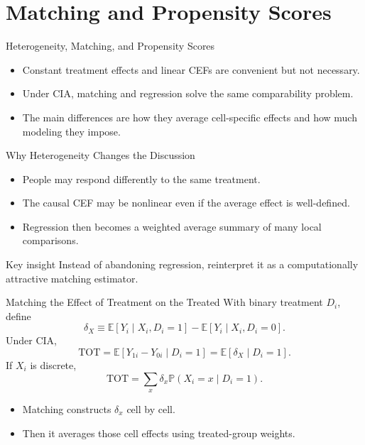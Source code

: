 \documentclass[11pt,aspectratio=169]{beamer}
\newcommand{\E}{\mathbb{E}}
\newcommand{\Prob}{\mathbb{P}}
\newcommand{\TOT}{\mathrm{TOT}}
\newcommand{\derivbutton}[1]{\vspace{0.4em}\hfill\hyperlink{app:#1}{\beamerbutton{Appendix details}}}
\begin{document}
\section{Matching and Propensity Scores}

\begin{frame}{Heterogeneity, Matching, and Propensity Scores}
  \begin{itemize}
    \item Constant treatment effects and linear CEFs are convenient but not necessary.
    \item Under CIA, matching and regression solve the same comparability problem.
    \item The main differences are how they average cell-specific effects and how much modeling they impose.
  \end{itemize}
\end{frame}

\begin{frame}{Why Heterogeneity Changes the Discussion}
  \begin{itemize}
    \item People may respond differently to the same treatment.
    \item The causal CEF may be nonlinear even if the average effect is well-defined.
    \item Regression then becomes a weighted average summary of many local comparisons.
  \end{itemize}
  \begin{block}{Key insight}
    Instead of abandoning regression, reinterpret it as a computationally attractive matching estimator.
  \end{block}
\end{frame}

\begin{frame}{Matching the Effect of Treatment on the Treated}
  \hypertarget{main:matching}{}
  With binary treatment \(D_i\), define
  \[
    \delta_X \equiv \E[Y_i \mid X_i,D_i=1]-\E[Y_i \mid X_i,D_i=0].
  \]
  Under CIA,
  \[
    \TOT
    =
    \E[Y_{1i}-Y_{0i}\mid D_i=1]
    =
    \E[\delta_X \mid D_i=1].
  \]
  If \(X_i\) is discrete,
  \[
    \TOT = \sum_x \delta_x \Prob(X_i=x \mid D_i=1).
  \]
  \begin{itemize}
    \item Matching constructs \(\delta_x\) cell by cell.
    \item Then it averages those cell effects using treated-group weights.
  \end{itemize}
  \derivbutton{matching-proof}
\end{frame}
\end{document}
